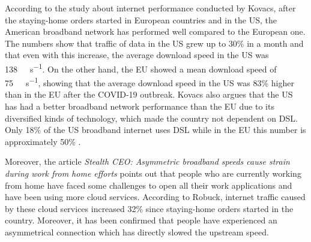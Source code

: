 \documentclass[conference,10pt]{IEEEtran}
\begin{document}





According to the study about internet performance conducted by Kovacs, after the staying-home orders started in European countries and in the US, the American broadband network has performed well compared to the European one. The numbers show that traffic of data in the US grew up to 30\% in a month and that even with this increase, the average download speed in the US was \SI{138}{\mega\bit\per\second}. On the other hand, the EU showed a mean download speed of \SI{75}{\mega\bit\per\second}, showing that the average download speed in the US was 83\% higher than in the EU after the COVID-19 outbreak. Kovacs also argues that the US has had a better broadband network performance than the EU due to its diversified kinds of technology, which made the country not dependent on DSL. Only 18\% of the US broadband internet uses DSL while in the EU this number is approximately 50\% \cite{kovacs}.

Moreover, the article \textit{Stealth CEO: Asymmetric broadband speeds cause strain during work from home efforts} \cite{robuck} points out that people who are currently working from home have faced some challenges to open all their work applications and have been using more cloud services. According to Robuck, internet traffic caused by these cloud services increased 32\% since staying-home orders started in the country. Moreover, it has been confirmed that people have experienced an asymmetrical connection which has directly slowed the upstream speed.
\end{document}
